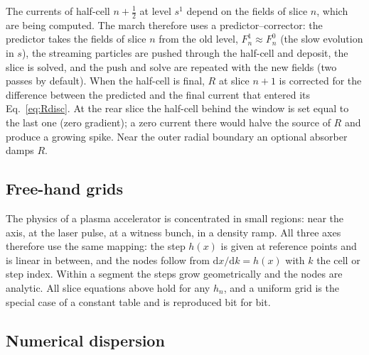 \documentclass[aps,prab,reprint,floatfix,superscriptaddress,amsmath,amssymb]{revtex4-2}
\newcommand{\dd}{\mathrm{d}}
\begin{document}
The currents of half-cell $n+\frac{1}{2}$ at level $s^1$ depend on the fields of slice $n$, which are being computed. The march therefore uses a predictor--corrector: the predictor takes the fields of slice $n$ from the old level, $F^1_n \approx F^0_n$ (the slow evolution in $s$), the streaming particles are pushed through the half-cell and deposit, the slice is solved, and the push and solve are repeated with the new fields (two passes by default). When the half-cell is final, $R$ at slice $n+1$ is corrected for the difference between the predicted and the final current that entered its Eq.~\eqref{eq:Rdisc}. At the rear slice the half-cell behind the window is set equal to the last one (zero gradient); a zero current there would halve the source of $R$ and produce a growing spike. Near the outer radial boundary an optional absorber damps $R$.

\subsection{Free-hand grids}\label{sec:grids}

The physics of a plasma accelerator is concentrated in small regions: near the axis, at the laser pulse, at a witness bunch, in a density ramp. All three axes therefore use the same mapping: the step $h(x)$ is given at reference points and is linear in between, and the nodes follow from $\dd x/\dd k = h(x)$ with $k$ the cell or step index. Within a segment the steps grow geometrically and the nodes are analytic. All slice equations above hold for any $h_n$, and a uniform grid is the special case of a constant table and is reproduced bit for bit.

\subsection{Numerical dispersion}\label{sec:dispersion}
\end{document}
